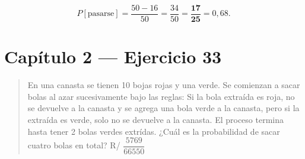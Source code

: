 \documentclass[11pt]{article}
\begin{document}
\begin{resp}
\[
P[\text{pasarse}]=\frac{50-16}{50}=\frac{34}{50}=\mathbf{\frac{17}{25}}=0{,}68 .
\]
\end{resp}

\section*{Cap\'itulo 2 --- Ejercicio 33}

\begin{quote}
En una canasta se tienen 10 bojas rojas y una verde. Se comienzan a sacar bolas al azar sucesivamente bajo las reglas: Si la bola extra\'ida es roja, no se devuelve a la canasta y se agrega una bola verde a la canasta, pero si la extra\'ida es verde, solo no se devuelve a la canasta. El proceso termina hasta tener 2 bolas verdes extr\'idas. ¿Cu\'al es la probabilidad de sacar cuatro bolas en total? \hfill R/ $\dfrac{5769}{66550}$
\end{quote}
\end{document}
